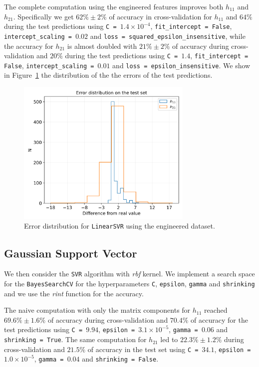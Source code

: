     The complete computation using the engineered features improves both $h_{11}$ and $h_{21}$. Specifically we get $62\% \pm 2\%$ of accuracy in cross-validation for $h_{11}$ and $64\%$ during the test predictions using \texttt{C = $1.4 \times 10^{-4}$}, \texttt{fit\_intercept = False}, \texttt{intercept\_scaling = $0.02$} and \texttt{loss = squared\_epsilon\_insensitive}, while the accuracy for $h_{21}$ is almost doubled with $21\% \pm 2\%$ of accuracy during cross-validation and $20\%$ during the test predictions using \texttt{C = $1.4$}, \texttt{fit\_intercept = False}, \texttt{intercept\_scaling = $0.01$} and \texttt{loss = epsilon\_insensitive}. We show in Figure~\ref{fig:lin_svr_err} the distribution of the the errors of the test predictions.
    
    \begin{figure}[t]
        \centering
        \includegraphics[width=0.75\textwidth]{tex/img/lin_svr_error_eng.png}
        \caption{Error distribution for \texttt{LinearSVR} using the engineered dataset.}
        \label{fig:lin_svr_err}
    \end{figure}
    
\subsection{Gaussian Support Vector}
    We then consider the \texttt{SVR} algorithm with \textit{rbf} kernel. We implement a search space for the \texttt{BayesSearchCV} for the hyperparameters \texttt{C}, \texttt{epsilon}, \texttt{gamma} and \texttt{shrinking} and we use the \textit{rint} function for the accuracy.
    
    The naive computation with only the matrix components for $h_{11}$ reached $69.6\% \pm 1.6\%$ of accuracy during cross-validation and $70.4\%$ of accuracy for the test predictions using \texttt{C = $9.94$}, \texttt{epsilon = $3.1 \times 10^{-5}$}, \texttt{gamma = $0.06$} and \texttt{shrinking = True}. The same computation for $h_{21}$ led to $22.3\% \pm 1.2\%$ during cross-validation and $21.5\%$ of accuracy in the test set using \texttt{C = $34.1$}, \texttt{epsilon = $1.0 \times 10^{-5}$}, \texttt{gamma = $0.04$} and \texttt{shrinking = False}.
    
